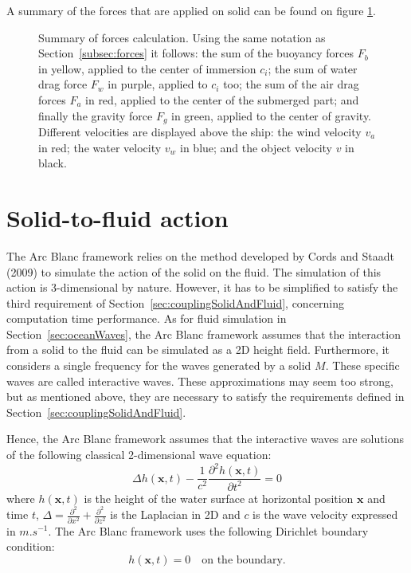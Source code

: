 \documentclass[final]{jcgt}
\def\Framework{The Arc Blanc framework\xspace}
\def\framework{the Arc Blanc framework\xspace}
\begin{document}
A summary of the forces that are applied on solid can be found on figure \ref{fig:forcesComputation}.

\begin{figure}[!h]
	\centering
	
	\caption{Summary of forces calculation. Using the same notation as Section~\ref{subsec:forces} it follows:
		the sum of the buoyancy forces \textcolor{jauneC}{$F_b$} in \textcolor{jauneC}{yellow}, applied to the center of immersion $c_i$;
		the sum of water drag force \textcolor{purpleF}{$F_w$} in \textcolor{purpleF}{purple}, applied to $c_i$ too;
		the sum of the air drag forces \textcolor{redF}{$F_a$} in \textcolor{redF}{red}, applied to the center of the submerged part;
		and finally the gravity force \textcolor{greenF}{$F_g$} in \textcolor{greenF}{green}, applied to the center of gravity.
		Different velocities are displayed above the ship:
		the wind velocity \textcolor{redF}{$v_a$} in \textcolor{redF}{red};
		the water velocity \textcolor{bleuF}{$v_w$} in \textcolor{bleuF}{blue};
		and the object velocity \textcolor{noirC}{$v$} in \textcolor{noirC}{black}.}
	\label{fig:forcesComputation}
\end{figure}

\section{Solid-to-fluid action}
\label{sec:solidToFluidAction}
\Framework relies on the method developed by Cords and Staadt (2009) \cite{cordsRealTimeOpenWater2009} to simulate the action of the solid on the fluid.
The simulation of this action is 3-dimensional by nature.
However, it has to be simplified to satisfy the third requirement of Section~\ref{sec:couplingSolidAndFluid}, concerning computation time performance.
As for fluid simulation in Section~\ref{sec:oceanWaves}, \framework assumes that the interaction from a solid to the fluid can be simulated as a 2D height field.
Furthermore, it considers a single frequency for the waves generated by a solid $M$.
These specific waves are called interactive waves.
These approximations may seem too strong, but as mentioned above, they are necessary to satisfy the requirements defined in Section~\ref{sec:couplingSolidAndFluid}.

Hence, \framework assumes that the interactive waves are solutions of the following classical 2-dimensional wave equation:
\begin{equation}
	\label{eq:2dwave}
	\Delta h(\mathbf x,t)-\frac{1}{c^2}\frac{\partial^2 h(\mathbf x,t)}{\partial t^2}=0
\end{equation}
where $h(\mathbf x,t)$ is the height of the water surface at horizontal position $\mathbf x$ and time $t$, $\Delta=\frac{\partial^2}{\partial x^2}+\frac{\partial^2}{\partial z^2}$ is the Laplacian in 2D and $c$ is the wave velocity expressed in $m.s^{-1}$.
\Framework uses the following Dirichlet boundary condition:
\begin{equation}
	h(\mathbf x,t) = 0 \text{~~~on the boundary.}
\end{equation}
\end{document}
